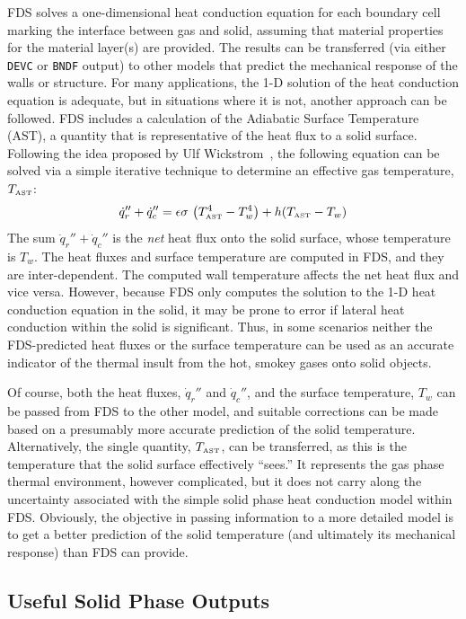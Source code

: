 \documentclass[11pt]{book}
\newcommand{\ct}{\tt\small}
\newcommand{\be}{\begin{equation}}
\newcommand{\ee}{\end{equation}}
\begin{document}
FDS solves a one-dimensional heat conduction equation for each
boundary cell marking the interface between gas and solid, assuming
that material properties for the material layer(s) are provided. The
results can be transferred (via either {\ct DEVC} or {\ct BNDF}
output) to other models that predict the mechanical response of the
walls or structure. For many applications, the 1-D solution of the
heat conduction equation is adequate, but in situations where it is
not, another approach can be followed. FDS includes a calculation of
the Adiabatic Surface Temperature (AST), a quantity that is
representative of the heat flux to a solid surface. Following the idea
proposed by Ulf Wickstrom~\cite{Wickstrom:Interflam2007}, the
following equation can be solved via a simple iterative technique to
determine an effective gas temperature, $T_{\hbox{\tiny AST}}$:
\be \dot{q}_r'' + \dot{q}_c'' = \epsilon \sigma \, \left(
T_{\hbox{\tiny AST}}^4 - T_w^4 \right) + h (T_{\hbox{\tiny AST}} - T_w)  \ee
The sum $\dot{q}_r'' + \dot{q}_c''$ is the {\em net} heat flux onto
the solid surface, whose temperature is $T_w$. The heat fluxes and
surface temperature are computed in FDS, and they are
inter-dependent. The computed wall temperature affects the net heat
flux and vice versa. However, because FDS only computes the solution
to the 1-D heat conduction equation in the solid, it may be prone to
error if lateral heat conduction within the solid is
significant. Thus, in some scenarios neither the FDS-predicted heat
fluxes or the surface temperature can be used as an accurate indicator
of the thermal insult from the hot, smokey gases onto solid objects.

Of course, both the heat fluxes, $\dot{q}_r''$ and $\dot{q}_c''$, and
the surface temperature, $T_w$ can be passed from FDS to the other
model, and suitable corrections can be made based on a presumably more
accurate prediction of the solid temperature.  Alternatively, the
single quantity, $T_{\hbox{\tiny AST}}$, can be transferred, as this
is the temperature that the solid surface effectively ``sees.'' It
represents the gas phase thermal environment, however complicated, but
it does not carry along the uncertainty associated with the simple
solid phase heat conduction model within FDS. Obviously, the objective
in passing information to a more detailed model is to get a better
prediction of the solid temperature (and ultimately its mechanical
response) than FDS can provide.


\subsection{Useful Solid Phase Outputs}
\label{info:material_components}
\end{document}
